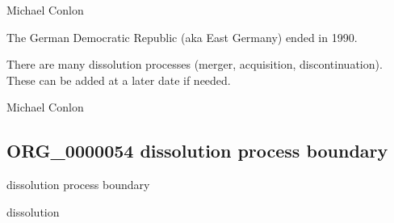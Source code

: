 \documentclass[letterpaper,10pt,english]{sphinxmanual}
\begin{document}
\begin{sphinxShadowBox}

\sphinxAtStartPar
Michael Conlon 
\end{sphinxShadowBox}

\begin{sphinxShadowBox}

\sphinxAtStartPar
The German Democratic Republic (aka East Germany) ended in 1990.
\end{sphinxShadowBox}

\begin{sphinxShadowBox}

\sphinxAtStartPar
There are many dissolution processes (merger, acquisition, discontinuation).  These can be added at a later date if needed.
\end{sphinxShadowBox}

\begin{sphinxShadowBox}

\sphinxAtStartPar
Michael Conlon 
\end{sphinxShadowBox}
\begin{quote}

\ignorespaces \end{quote}


\subsection{ORG\_0000054 \sphinxhyphen{} dissolution process boundary}
\label{\detokenize{doc-ORG_0000054:org-0000054-dissolution-process-boundary}}\label{\detokenize{doc-ORG_0000054:index-0}}\label{\detokenize{doc-ORG_0000054::doc}}
\begin{sphinxShadowBox}

\sphinxAtStartPar
dissolution process boundary
\end{sphinxShadowBox}

\begin{sphinxShadowBox}

\sphinxAtStartPar
dissolution
\end{sphinxShadowBox}
\end{document}
